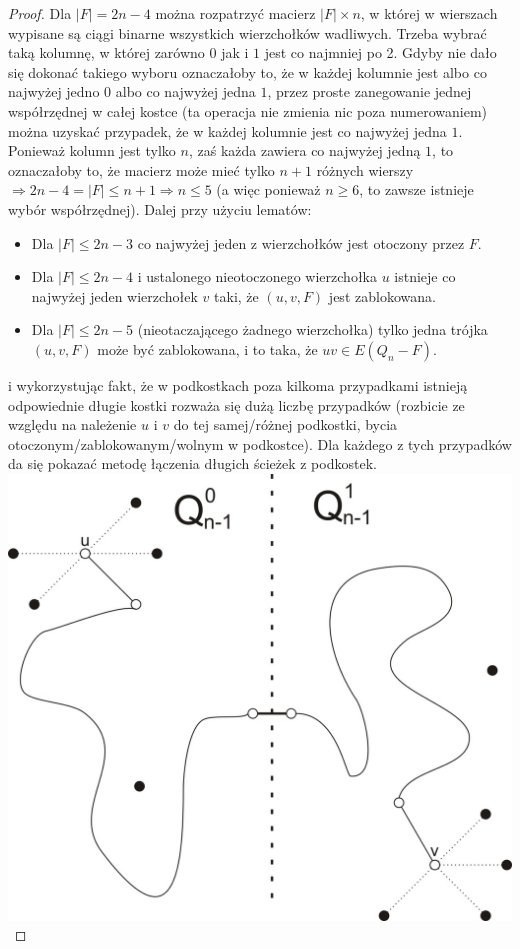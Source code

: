\documentclass{pracamgr}
\begin{document}
\begin{proof}
    Dla $|F|=2n-4$ można rozpatrzyć macierz $|F|\times n$, w której w wierszach wypisane są ciągi binarne wszystkich wierzchołków wadliwych.
    Trzeba wybrać taką kolumnę, w której zarówno $0$ jak i $1$ jest co najmniej po 2. Gdyby nie dało się dokonać takiego wyboru oznaczałoby to, że
    w każdej kolumnie jest albo co najwyżej jedno $0$ albo co najwyżej jedna $1$, przez proste zanegowanie jednej współrzędnej w całej kostce
    (ta operacja nie zmienia nic poza numerowaniem) można uzyskać przypadek, że w każdej kolumnie jest co najwyżej jedna $1$. 
    Ponieważ kolumn jest tylko $n$, zaś każda zawiera co najwyżej jedną $1$, to oznaczałoby to, że macierz może mieć tylko $n+1$ różnych wierszy
    $\Rightarrow 2n-4=|F|\le n+1\Rightarrow n\le5$ (a więc ponieważ $n\ge 6$, to zawsze istnieje wybór współrzędnej).\newline
    Dalej przy użyciu lematów:
    \begin{itemize}
     \item Dla $|F|\le 2n-3$ co najwyżej jeden z wierzchołków jest otoczony przez $F$.
     \item Dla $|F|\le 2n-4$ i ustalonego nieotoczonego wierzchołka $u$ istnieje co najwyżej jeden wierzchołek $v$ taki, że $(u,v,F)$ jest zablokowana.
     \item Dla $|F|\le 2n-5$ (nieotaczającego żadnego wierzchołka) tylko jedna trójka $(u,v,F)$ może być zablokowana, i to taka, że $uv\in E(Q_n-F)$.
    \end{itemize}
    i wykorzystując fakt, że w podkostkach poza kilkoma przypadkami istnieją odpowiednie długie kostki rozważa się dużą liczbę przypadków
    (rozbicie ze względu na należenie $u$ i $v$ do tej samej/różnej podkostki, bycia otoczonym/zablokowanym/wolnym w podkostce).
    Dla każdego z tych przypadków da się pokazać metodę łączenia długich ścieżek z podkostek.\newline
   \includegraphics[scale=0.5]{img/sciezka_laczenie1.jpg}\quad\quad\quad\quad

\end{proof}
\end{document}
